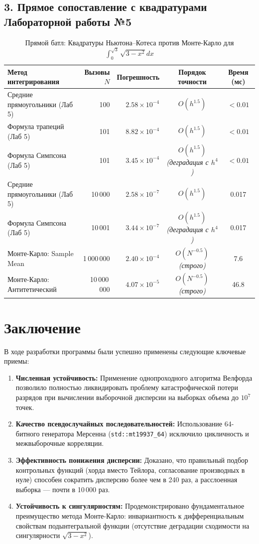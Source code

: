 \documentclass[11pt,a4paper]{article}
\begin{document}
\subsection{3. Прямое сопоставление с квадратурами Лабораторной работы №5}
\begin{table}[h!]
\centering
\small
\begin{tabular}{lrrcc}
\toprule
\textbf{Метод интегрирования} & \textbf{Вызовы $N$} & \textbf{Погрешность} & \textbf{Порядок точности} & \textbf{Время (мс)} \\
\midrule
Средние прямоугольники (Лаб 5) & 100 & $2.58 \times 10^{-4}$ & $O(h^{1.5})$ & $<0.01$ \\
Формула трапеций (Лаб 5) & 101 & $8.82 \times 10^{-4}$ & $O(h^{1.5})$ & $<0.01$ \\
Формула Симпсона (Лаб 5) & 101 & $3.45 \times 10^{-4}$ & $O(h^{1.5})$ \textit{(деградация с $h^4$)} & $<0.01$ \\
Средние прямоугольники (Лаб 5) & 10\,000 & $2.58 \times 10^{-7}$ & $O(h^{1.5})$ & 0.017 \\
Формула Симпсона (Лаб 5) & 10\,001 & $3.44 \times 10^{-7}$ & $O(h^{1.5})$ \textit{(деградация с $h^4$)} & 0.017 \\
\midrule
Монте-Карло: Sample Mean & 1\,000\,000 & $2.40 \times 10^{-4}$ & $O(N^{-0.5})$ \textit{(строго)} & 7.6 \\
Монте-Карло: Антитетический & 10\,000\,000 & $4.07 \times 10^{-5}$ & $O(N^{-0.5})$ \textit{(строго)} & 46.8 \\
\bottomrule
\end{tabular}
\caption{Прямой батл: Квадратуры Ньютона--Котеса против Монте-Карло для $\int_0^{\sqrt{3}} \sqrt{3-x^2} dx$}
\end{table}

\newpage

\section{Заключение}

В ходе разработки программы были успешно применены следующие ключевые приемы:
\begin{enumerate}
    \item \textbf{Численная устойчивость:} Применение однопроходного алгоритма Велфорда позволило полностью ликвидировать проблему катастрофической потери разрядов при вычислении выборочной дисперсии на выборках объема до $10^7$ точек.
    \item \textbf{Качество псевдослучайных последовательностей:} Использование 64-битного генератора Мерсенна (\texttt{std::mt19937\_64}) исключило цикличность и межвыборочные корреляции.
    \item \textbf{Эффективность понижения дисперсии:} Доказано, что правильный подбор контрольных функций (хорда вместо Тейлора, согласование производных в нуле) способен сократить дисперсию более чем в 240 раз, а расслоенная выборка --- почти в 10\,000 раз.
    \item \textbf{Устойчивость к сингулярностям:} Продемонстрировано фундаментальное преимущество метода Монте-Карло: инвариантность к дифференциальным свойствам подынтегральной функции (отсутствие деградации сходимости на сингулярности $\sqrt{3 - x^2}$).
\end{enumerate}
\end{document}

